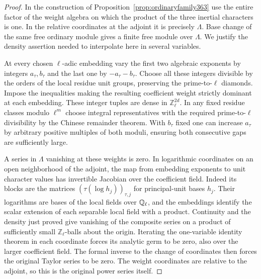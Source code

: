 \documentclass[a4paper,11pt]{article}
\theoremstyle{definition}
\theoremstyle{remark}
\newcommand{\ZZ}{\mathbb Z}\newcommand{\ord}{\operatorname{ord}}
\numberwithin{equation}{section}
\begin{document}
\begin{proof}
In the construction of Proposition~\ref{prop:ordinaryfamily363}
use the entire factor of the weight algebra on which the product
of the three inertial characters is one. In the relative
coordinates at the adjoint it is precisely \(\Lambda\).
Base change of the same free ordinary module gives a finite
free module over \(\Lambda\). We justify the density assertion
needed to interpolate here in several variables.

At every chosen \(\ell\)-adic embedding vary the first two
algebraic exponents by integers \(a_\tau,b_\tau\) and the last
one by \(-a_\tau-b_\tau\). Choose all these integers divisible
by the orders of the local residue unit groups, preserving
the prime-to-\(\ell\) diamonds. Impose the inequalities
making the resulting coefficient weight strictly dominant at
each embedding. These integer tuples are dense in
\(\ZZ_\ell^{2d}\). In any fixed residue classes modulo
\(\ell^m\) choose integral representatives with the required
prime-to-\(\ell\) divisibility by the Chinese remainder theorem.
With \(b_\tau\) fixed one can increase \(a_\tau\) by arbitrary
positive multiples of both moduli, ensuring both consecutive
gaps are sufficiently large.

A series in \(\Lambda\) vanishing at these weights is zero.
In logarithmic coordinates on an open neighborhood of the
adjoint, the map from embedding exponents to unit character
values has invertible Jacobian over the coefficient field.
Indeed its blocks are the matrices
\((\tau(\log h_j))_{\tau,j}\) for principal-unit bases
\(h_j\). Their logarithms are bases of the local fields
over \(\mathbb Q_\ell\), and the embeddings identify the scalar
extension of each separable local field with a product.
Continuity and the density just proved give vanishing of the
composite series on a product of sufficiently small
\(\ZZ_\ell\)-balls about the origin. Iterating the
one-variable identity theorem in each coordinate forces its
analytic germ to be zero, also over the larger coefficient
field. The formal inverse to the change of coordinates then
forces the original Taylor series to be zero. The weight
coordinates are relative to the adjoint, so this is the
original power series itself.


\end{proof}
\end{document}
